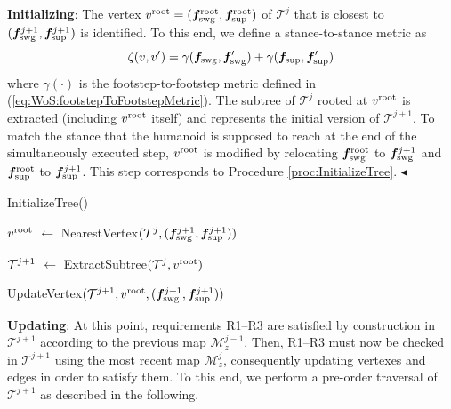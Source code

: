 {\bf Initializing}: The vertex $v^{\rm root} = ({\bm{f}}_{\rm swg}^{\rm root}, {\bm{f}}_{\rm sup}^{\rm root})$ of $\mathcal{T}^{j}$ that is closest to $({\bm{f}}_{\rm swg}^{j+1}, {\bm{f}}_{\rm sup}^{j+1})$ is identified. To this end, we define a stance-to-stance metric as
\begin{equation}
    \label{eq:WoS:metricIdentifyRoot}
    \zeta(v, v') = \gamma({\bm{f}}_{\rm swg}, {\bm{f}}'_{\rm swg}) + \gamma({\bm{f}}_{\rm sup}, {\bm{f}}'_{\rm sup}) 
\end{equation}
where $\gamma(\cdot)$ is the footstep-to-footstep metric defined in
(\ref{eq:WoS:footstepToFootstepMetric}).
The subtree of $\mathcal{T}^{j}$ rooted at $v^{\rm root}$ is extracted
(including $v^{\rm root}$ itself) and represents the initial version of
$\mathcal{T}^{j+1}$.
To match the stance that the humanoid is supposed to reach at the end of the
simultaneously executed step, $v^{\rm root}$ is modified by relocating
${\bm{f}}_{\rm swg}^{\rm root}$ to ${\bm{f}}_{\rm swg}^{j+1}$ and
${\bm{f}}_{\rm sup}^{\rm root}$ to ${\bm{f}}_{\rm sup}^{j+1}$.
This step corresponds to Procedure \ref{proc:InitializeTree}.
\hfill $\blacktriangleleft$
\begin{procedure}%
	\small
	\removelatexerror
	\caption{InitializeTree()}
	\label{proc:InitializeTree}

	\vspace{2pt}
    \BlankLine
	
	$v^{\rm root}$ $\leftarrow$ NearestVertex$({\cal T}^j, ({\bm{f}}_{\rm swg}^{j+1}, {\bm{f}}_{\rm sup}^{j+1}))$\;
	
	${\cal T}^{j+1}$ $\leftarrow$ ExtractSubtree$({\cal T}^j, v^{\rm root})$\;
	
	UpdateVertex$({\cal T}^{j+1}, v^{\rm root}, ({\bm{f}}_{\rm swg}^{j+1}, {\bm{f}}_{\rm sup}^{j+1}))$\;
	
    \;
	
\end{procedure}

{\bf Updating}: At this point, requirements R1--R3 are satisfied by
construction in $\mathcal{T}^{j+1}$ according to the previous map
$\mathcal{M}_z^{j-1}$.
Then, R1--R3 must now be checked in $\mathcal{T}^{j+1}$ using the most recent
map $\mathcal{M}_z^{j}$, consequently updating vertexes and edges in order to
satisfy them.
To this end, we perform a pre-order traversal of $\mathcal{T}^{j+1}$ as
described in the following.

